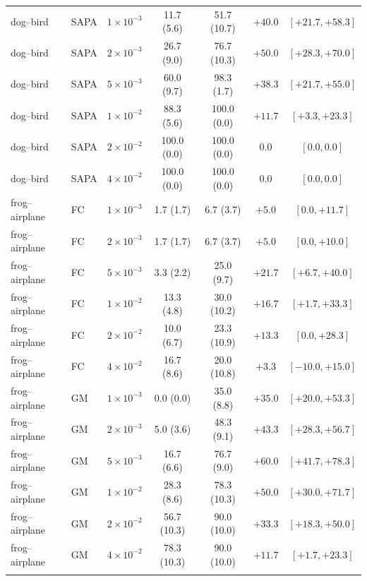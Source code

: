 \begin{table}[p]
\begin{tabular}{llccccc}
dog--bird & SAPA & $1{\times}10^{-3}$ & 11.7 (5.6) & 51.7 (10.7) & $+40.0$ & $[+21.7, +58.3]$ \\
dog--bird & SAPA & $2{\times}10^{-3}$ & 26.7 (9.0) & 76.7 (10.3) & $+50.0$ & $[+28.3, +70.0]$ \\
dog--bird & SAPA & $5{\times}10^{-3}$ & 60.0 (9.7) & 98.3 (1.7) & $+38.3$ & $[+21.7, +55.0]$ \\
dog--bird & SAPA & $1{\times}10^{-2}$ & 88.3 (5.6) & 100.0 (0.0) & $+11.7$ & $[+3.3, +23.3]$ \\
dog--bird & SAPA & $2{\times}10^{-2}$ & 100.0 (0.0) & 100.0 (0.0) & $0.0$ & $[0.0, 0.0]$ \\
dog--bird & SAPA & $4{\times}10^{-2}$ & 100.0 (0.0) & 100.0 (0.0) & $0.0$ & $[0.0, 0.0]$ \\

\midrule

frog--airplane & FC & $1{\times}10^{-3}$ & 1.7 (1.7) & 6.7 (3.7) & $+5.0$ & $[0.0, +11.7]$ \\
frog--airplane & FC & $2{\times}10^{-3}$ & 1.7 (1.7) & 6.7 (3.7) & $+5.0$ & $[0.0, +10.0]$ \\
frog--airplane & FC & $5{\times}10^{-3}$ & 3.3 (2.2) & 25.0 (9.7) & $+21.7$ & $[+6.7, +40.0]$ \\
frog--airplane & FC & $1{\times}10^{-2}$ & 13.3 (4.8) & 30.0 (10.2) & $+16.7$ & $[+1.7, +33.3]$ \\
frog--airplane & FC & $2{\times}10^{-2}$ & 10.0 (6.7) & 23.3 (10.9) & $+13.3$ & $[0.0, +28.3]$ \\
frog--airplane & FC & $4{\times}10^{-2}$ & 16.7 (8.6) & 20.0 (10.8) & $+3.3$ & $[-10.0, +15.0]$ \\
\addlinespace[2pt]

frog--airplane & GM & $1{\times}10^{-3}$ & 0.0 (0.0) & 35.0 (8.8) & $+35.0$ & $[+20.0, +53.3]$ \\
frog--airplane & GM & $2{\times}10^{-3}$ & 5.0 (3.6) & 48.3 (9.1) & $+43.3$ & $[+28.3, +56.7]$ \\
frog--airplane & GM & $5{\times}10^{-3}$ & 16.7 (6.6) & 76.7 (9.0) & $+60.0$ & $[+41.7, +78.3]$ \\
frog--airplane & GM & $1{\times}10^{-2}$ & 28.3 (8.6) & 78.3 (10.3) & $+50.0$ & $[+30.0, +71.7]$ \\
frog--airplane & GM & $2{\times}10^{-2}$ & 56.7 (10.3) & 90.0 (10.0) & $+33.3$ & $[+18.3, +50.0]$ \\
frog--airplane & GM & $4{\times}10^{-2}$ & 78.3 (10.3) & 90.0 (10.0) & $+11.7$ & $[+1.7, +23.3]$ \\
\addlinespace[2pt]


\end{tabular}
\end{table}
